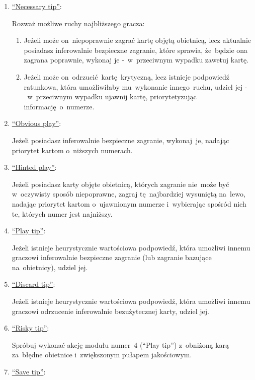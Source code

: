 \documentclass[declaration,shortabstract,inz]{iithesis}
\begin{document}
\begin{enumerate}
	\item \underline{``Necessary tip''}:

	Rozważ możliwe ruchy najbliższego gracza:
	\begin{enumerate}
		\item Jeżeli może on~niepoprawnie zagrać kartę objętą obietnicą, lecz aktualnie posiadasz inferowalnie bezpieczne zagranie, które sprawia, że~będzie ona zagrana poprawnie, wykonaj je -~w~przeciwnym wypadku zawetuj kartę.
		\item Jeżeli może on~odrzucić kartę krytyczną, lecz istnieje podpowiedź ratunkowa, która umożliwiłaby mu~wykonanie innego ruchu, udziel jej -~w~przeciwnym wypadku ujawnij kartę, priorytetyzując informację o~numerze.
	\end{enumerate}

	\item \underline{``Obvious play''}:
	
	Jeżeli posiadasz inferowalnie bezpieczne zagranie, wykonaj~je, nadając priorytet kartom o~niższych numerach.
	
	\item \underline{``Hinted play''}:

	Jeżeli posiadasz karty objęte obietnicą, których zagranie nie~może być w~oczywisty sposób niepoprawne, zagraj tę~najbardziej wysuniętą na~lewo, nadając priorytet kartom o~ujawnionym numerze i~wybierając spośród nich te, których numer jest najniższy.

	\item \underline{``Play tip''}:
	
	Jeżeli istnieje heurystycznie wartościowa podpowiedź, która umożliwi innemu graczowi inferowalnie bezpieczne zagranie (lub zagranie bazujące na~obietnicy), udziel jej.

	\item \underline{``Discard tip''}:
	
	Jeżeli istnieje heurystycznie wartościowa podpowiedź, która umożliwi innemu graczowi odrzucenie inferowalnie bezużytecznej karty, udziel jej.

	\item \underline{``Risky tip''}:
	
	Spróbuj wykonać akcję modułu numer~4 (``Play tip'') z~obniżoną karą za~błędne obietnice i~zwiększonym pułapem jakościowym.
	
	\item \underline{``Save tip''}:
	

\end{enumerate}
\end{document}
